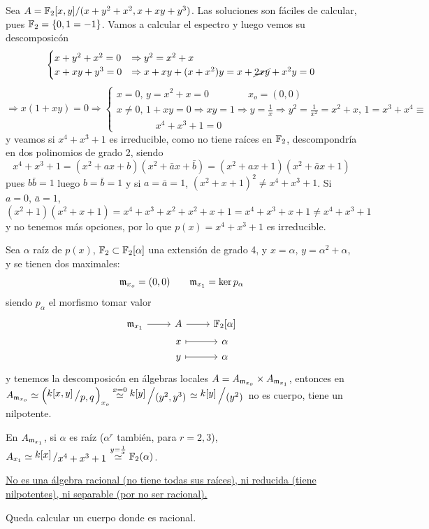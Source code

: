 \begin{ejer}
    [examen] Sea $A = \mathbb{F}_2[x,y] / (x+y^2+x^2, x+xy+y^3)$. Las soluciones son f\'aciles de calcular, pues $\mathbb{F}_2=\{0,1=-1\}$. Vamos a calcular el espectro y luego vemos su descomposic\'on
    $$\begin{cases}
        x+y^2+x^2 = 0 & \Rightarrow y^2 = x^2+x  \\  x+xy+y^3=0 & \Rightarrow x+xy+(x+x^2) y = x+\cancel{2xy} + x^2y = 0 
    \end{cases}  $$
    $$\Rightarrow x(1+xy) = 0 \Rightarrow \begin{cases}
        x=0, \, y = x^2+x=0 \qquad \qquad x_o=(0,0)\\ x\neq 0, \, 1+xy = 0 \Rightarrow xy=1 \Rightarrow y = \frac{1}{x} \Rightarrow y^2=\frac{1}{x^2} = x^2+x , \, 1=x^3+x^4 \equiv \\ \qquad \qquad  x^4+x^3+1=0
    \end{cases}$$
    y veamos si $x^4+x^3+1$ es irreducible, como no tiene ra\'ices en $\mathbb{F}_2$, descompondr\'ia en dos polinomios de grado 2, siendo
    $$x^4+x^3+1 = (x^2+ax+b)(x^2+\bar ax +\bar b)= (x^2+ax+1)(x^2+\bar ax +1)$$
    pues $b\bar b=1$ luego $b=\bar b=1$ y si $a=\bar a =1$, $(x^2+x+1)^2\neq x^4+x^3+1$. Si $a=0$, $\bar a =1$,
    $$(x^2+1)(x^2+x+1) = x^4 + x^3 + x^2 + x^2 + x+ 1 = x^4+x^3+x+1 \neq x^4+x^3+1$$
    y no tenemos m\'as opciones, por lo que $p(x) = x^4+x^3+1$ es irreducible. 

    Sea $\alpha$ ra\'iz de $p(x)$, $\mathbb{F}_2 \subset \mathbb{F}_2[\alpha]$ una extensi\'on de grado 4, y $x=\alpha, \, y = \alpha^2+\alpha$, y se tienen dos maximales:
    $$\mathfrak{m}_{x_o} = (0,0) \qquad \mathfrak{m}_{x_1} = \ker p_{\alpha}$$
    siendo $p_{\alpha}$ el morfismo tomar valor 
    $$\bt \m_{x_1} \rar & A \rar & \bb F_2[\alpha] \\[-5mm] & x \rarmaps & \alpha \\[-5mm] & y \rarmaps & \alpha \et$$
    y tenemos la descomposic\'on en \'algebras locales $A=  A_{\mathfrak{m}_{x_o}} \times A_{\mathfrak{m}_{x_1}}$, entonces en $A_{\m_{x_o}} \simeq \left( \modulo{k[x,y]}{p,q} \right)_{x_o} \overset{x=0}{\simeq} \modulo{k[y]}{(y^2, y^3)} \simeq \modulo{k[y]}{(y^2)}$ no es cuerpo, tiene un nilpotente.
    
    En $A_{\mathfrak{m}_{x_1}}$, si $\alpha$ es ra\'iz ($\alpha^r$ tambi\'en, para $r=2,3$), $A_{x_1}\simeq \modulo{k[x]}{x^4+x^3+1} \overset{y=\frac{1}{x}}{\simeq} \bb F_2(\alpha)$.
    
    \underline{No es una \'algebra racional (no tiene todas sus ra\'ices), ni reducida (tiene nilpotentes), ni separable (por no ser racional).}

    Queda calcular un cuerpo donde es racional. 
\end{ejer} 

